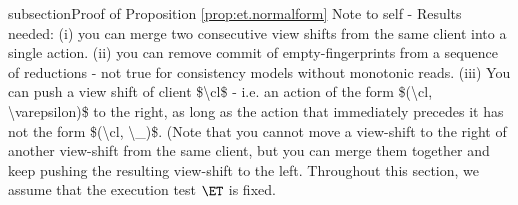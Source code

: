 
subsection{Proof of Proposition \ref{prop:et.normalform}}
\ac{Note to self - Results needed: (i) you can merge two consecutive view shifts from the same client into a single action. (ii) 
you can remove commit of empty-fingerprints from a sequence of reductions - not true for consistency models 
without monotonic reads. (iii) You can push a view 
shift of client $\cl$ - i.e. an action of the form $(\cl, \varepsilon)$ to the right, as long as the action that immediately precedes it has not the form 
$(\cl, \_)$. (Note that you cannot move a view-shift to the right of another view-shift from the same 
client, but you can merge them together and keep pushing the resulting view-shift to the left.}
Throughout this section, we assume that the execution test $\ET$ is fixed.

